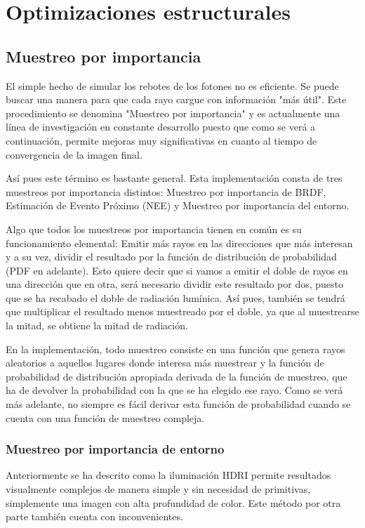 \chapter{Optimizaciones estructurales}
	
\section{Muestreo por importancia}
\label{sec:mi}

El simple hecho de simular los rebotes de los fotones no es eficiente. Se puede buscar una manera para que cada rayo cargue con información "más útil". Este procedimiento se denomina "Muestreo por importancia" y es actualmente una línea de investigación en constante desarrollo puesto que como se verá a continuación, permite mejoras muy significativas en cuanto al tiempo de convergencia de la imagen final.

Así pues este término es bastante general. Esta implementación consta de tres muestreos por importancia distintos: Muestreo por importancia de BRDF, Estimación de Evento Próximo (NEE) y Muestreo por importancia del entorno.

Algo que todos los muestreos por importancia tienen en común es su funcionamiento elemental: Emitir más rayos en las direcciones que más interesan y a su vez, dividir el resultado por la función de distribución de probabilidad (PDF en adelante). Esto quiere decir que si vamos a emitir el doble de rayos en una dirección que en otra, será necesario dividir este resultado por dos, puesto que se ha recabado el doble de radiación lumínica. Así pues, también se tendrá que multiplicar el resultado menos muestreado por el doble, ya que al muestrearse la mitad, se obtiene la mitad de radiación.

En la implementación, todo muestreo consiste en una función que genera rayos aleatorios a aquellos lugares donde interesa más muestrear y la función de probabilidad de distribución apropiada derivada de la función de muestreo, que ha de devolver la probabilidad con la que se ha elegido ese rayo. Como se verá más adelante, no siempre es fácil derivar esta función de probabilidad cuando se cuenta con una función de muestreo compleja.


\subsection{Muestreo por importancia de entorno}
	
Anteriormente se ha descrito como la iluminación HDRI permite resultados visualmente complejos de manera simple y sin necesidad de primitivas, simplemente una imagen con alta profundidad de color. Este método por otra parte también cuenta con inconvenientes. 

